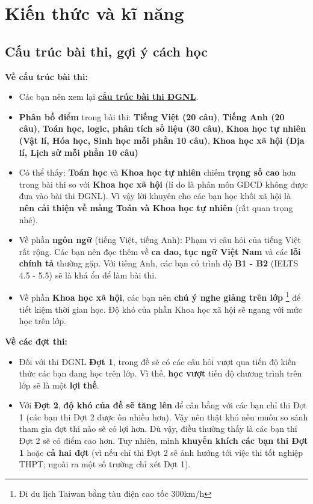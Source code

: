 \newpage
\section{Kiến thức và kĩ năng}
\label{sec:bigbasic}

\subsection{Cấu trúc bài thi, gợi ý cách học}
\label{sec:goiycachhoc}
\textbf{Về cấu trúc bài thi:}
\begin{itemize}
    \item Các bạn nên xem lại \textbf{\hyperref[cautrucbaithi]{cấu trúc bài thi ĐGNL}}.
    \item \textbf{Phân bố điểm} trong bài thi: \textbf{Tiếng Việt (20 câu)}, \textbf{Tiếng Anh (20 câu)}, \textbf{Toán học, logic, phân tích số liệu (30 câu)}, \textbf{Khoa học tự nhiên (Vật lí, Hóa học, Sinh học mỗi phần 10 câu)}, \textbf{Khoa học xã hội (Địa lí, Lịch sử mỗi phần 10 câu)}
    \item Có thể thấy: \textbf{Toán học} và \textbf{Khoa học tự nhiên} chiếm \textbf{trọng số cao} hơn trong bài thi so với \textbf{Khoa học xã hội} (lí do là phân môn GDCD không được đưa vào bài thi ĐGNL). Vì vậy lời khuyên cho các bạn học khối xã hội là \textbf{nên cải thiện về mảng Toán và Khoa học tự nhiên} (rất quan trọng nhé).
    \item Về phần \textbf{ngôn ngữ} (tiếng Việt, tiếng Anh): Phạm vi câu hỏi của tiếng Việt rất rộng. Các bạn nên đọc thêm về \textbf{ca dao, tục ngữ Việt Nam} và các \textbf{lỗi chính tả} thường gặp. Với tiếng Anh, các bạn có trình độ \textbf{B1 - B2} (IELTS 4.5 - 5.5) sẽ là khá ổn để làm bài thi.
    \item Về phần \textbf{Khoa học xã hội}, các bạn nên \textbf{chú ý nghe giảng trên lớp} \footnote{Đi du lịch Taiwan bằng tàu điện cao tốc 300km/h} để tiết kiệm thời gian học. Độ khó của phần Khoa học xã hội sẽ ngang với mức học trên lớp.
\end{itemize}
\textbf{Về các đợt thi:}
\begin{itemize}
     \item Đối với thi ĐGNL \textbf{Đợt 1}, trong đề sẽ có các câu hỏi vượt qua tiến độ kiến thức các bạn đang học trên lớp. Vì thế, \textbf{học vượt} tiến độ chương trình trên lớp sẽ là một \textbf{lợi thế}. 
    \item Với \textbf{Đợt 2}, \textbf{độ khó của đề sẽ tăng lên} để cân bằng với các bạn chỉ thi Đợt 1 (các bạn thi Đợt 2 được ôn nhiều hơn). Vậy nên thật khó nếu muốn so sánh tham gia đợt thi nào sẽ có lợi hơn. Dù vậy, điều thường thấy là các bạn thi Đợt 2 sẽ có điểm cao hơn. Tuy nhiên, mình \textbf{khuyến khích các bạn thi Đợt 1} hoặc \textbf{cả hai đợt} (vì nếu chỉ thi Đợt 2 sẽ ảnh hướng tới việc thi tốt nghiệp THPT; ngoài ra một số trường chỉ xét Đợt 1).
\end{itemize}
